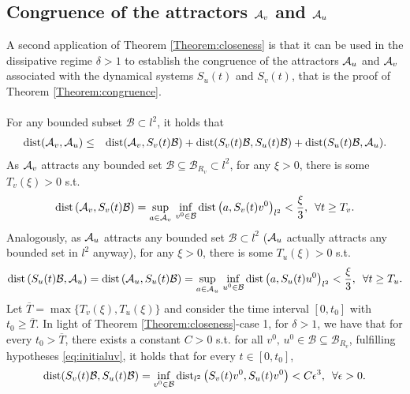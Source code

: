 \documentclass[preprintnumbers,amsmath,amssymb]{revtex4}
\begin{document}
\subsection{Congruence of the attractors ${\cal A}_v$ and ${\cal A}_u$}\label{section:congruence}
A second application of Theorem \ref{Theorem:closeness} is that it can be used in the dissipative regime $\delta>1$ to establish the congruence of the attractors ${\cal A}_u$ and ${\cal A}_v$ associated with the dynamical systems $S_u(t)$ and $S_v(t)$, that is the proof of Theorem \ref{Theorem:congruence}. \\
\\
For any bounded subset $\mathcal{B}\subset l^2$, it holds that 
\begin{eqnarray}
 {\rm dist}({\cal A}_v,{\cal A}_u)&\le& {\rm dist}({\cal A}_v,S_v(t)\mathcal{B})+   {\rm dist}(S_v(t)\mathcal{B},S_u(t)\mathcal{B})+ {\rm dist}(S_u(t)\mathcal{B},{\cal A}_u).
\end{eqnarray}
  As ${\cal A}_v$ attracts any bounded set $\mathcal{B}\subseteq \mathcal{B}_{R_v}\subset l^2$, for  
    any $\xi >0$, there is some $T_v(\xi)>0$ s.t. 
  \begin{equation}
  {\rm dist}\left({\cal A}_v,S_v(t)\mathcal{B}\right)=\sup_{a\in 
 {\cal A}_v}\,\inf_{v^0 \in \mathcal{B}} {\rm dist}\left(a,S_v(t)v^0\right)_{l^2} <\frac{\xi}{3},\,\,\,\forall t\ge T_v. \label{eq:ineqc1}
 \end{equation}
  Analogously, as   ${\cal A}_u$ attracts any bounded set $\mathcal{B}\subset l^2$ (${\cal A}_u$ actually attracts any bounded set in $l^2$ anyway),  
  for 
    any $\xi >0$, there is some $T_u(\xi)>0$ s.t. 
  \begin{equation}
  {\rm dist}\left(S_u(t)\mathcal{B},{\cal A}_u\right)={\rm dist}\left({\cal A}_u,S_u(t)\mathcal{B}\right)
  =\sup_{a\in 
 {\cal A}_u}\,\inf_{u^0 \in \mathcal{B}} {\rm dist}\left(a,S_u(t)u^0\right)_{l^2}
  <\frac{\xi}{3},\,\,\,\forall t\ge T_u. \label{eq:ineqc2}
 \end{equation}
 Let $\overline{T}=\max\{T_v(\xi),T_u(\xi)\}$ and consider the time interval $[0,t_0]$ with $t_0\ge \overline{T}$.
In light of Theorem \ref{Theorem:closeness}-case 1, for $\delta>1$, we have that for  every $t_0>\overline{T}$, there exists a constant $C>0$ s.t. for all 
$v^0,\,u^0 \in \mathcal{B} \subseteq \mathcal{B}_{R_v}$, fulfilling hypotheses \eqref{eq:initialuv}, it holds that for every $t\in [0,t_0]$,
 \begin{equation}
{\rm dist}(S_v(t)\mathcal{B},S_u(t)\mathcal{B})=\inf_{v^0 \in \mathcal{B}}  {\rm dist}_{l^2}\left(S_v(t)v^0,S_u(t)v^0\right)
  <C{\epsilon^3},\,\,\,\forall \epsilon>0.\label{eq:ineqc3}
 \end{equation}
  
\end{document}
